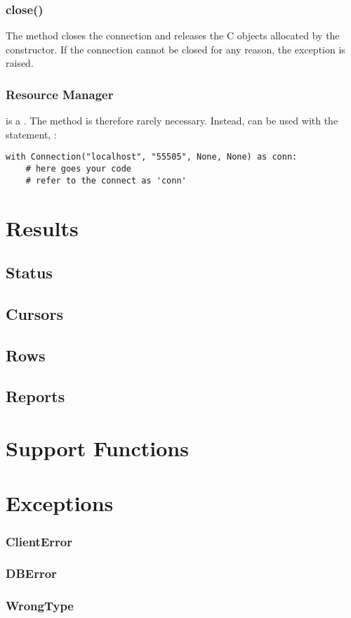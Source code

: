 \subsubsection{close()}
The method closes the connection and
releases the C objects allocated by
the constructor. If the connection
cannot be closed for any reason,
the exception  is raised.

\subsubsection{Resource Manager}
 is a .
The method  is therefore
rarely necessary. Instead,  can
be used with the  statement, \ie:

\begin{python}
\begin{lstlisting}
with Connection("localhost", "55505", None, None) as conn:
    # here goes your code
    # refer to the connect as 'conn'
\end{lstlisting}
\end{python}

\section{Results}
\subsection{Status}
\subsection{Cursors}
\subsection{Rows}
\subsection{Reports}
\section{Support Functions}
\section{Exceptions}
\subsubsection{ClientError}
\subsubsection{DBError}
\subsubsection{WrongType}

